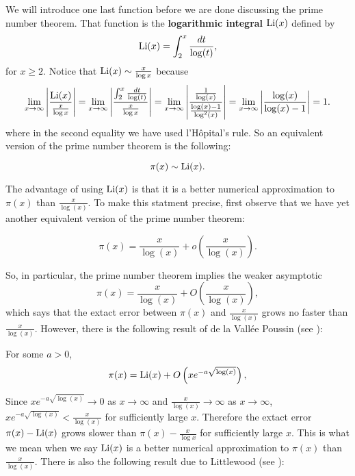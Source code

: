       We will introduce one last function before we are done discussing the prime number theorem. That function is the \textbf{logarithmic integral} $\operatorname{\mathrm{Li}}(x)$ defined by
      \[
        \operatorname{\mathrm{Li}}(x) = \int_{2}^{x}\frac{dt}{\log(t)},
      \]
      for $x \ge 2$. Notice that $\operatorname{\mathrm{Li}}(x) \sim \frac{x}{\log{x}}$ because
      \[
        \lim_{x \to \infty}\left|\frac{\operatorname{\mathrm{Li}}(x)}{\frac{x}{\log{x}}}\right| = \lim_{x \to \infty}\left|\frac{\int_{2}^{x}\frac{dt}{\log(t)}}{\frac{x}{\log{x}}}\right| = \lim_{x \to \infty}\left|\frac{\frac{1}{\log(x)}}{\frac{\log(x)-1}{\log^{2}(x)}}\right| = \lim_{x \to \infty}\left|\frac{\log(x)}{\log(x)-1}\right| = 1.
      \]
      where in the second equality we have used  l'H\^opital's rule. So an equivalent version of the prime number theorem is the following:

      \begin{theorem}
        \phantom{ }
        \[
          \pi(x) \sim \operatorname{\mathrm{Li}}(x).
        \]
      \end{theorem}

      The advantage of using $\operatorname{\mathrm{Li}}(x)$ is that it is a better numerical approximation to $\pi(x)$ than $\frac{x}{\log(x)}$. To make this statment precise, first observe that we have yet another equivalent version of the prime number theorem:

      \begin{theorem}
        \phantom{ }
        \[
          \pi(x) = \frac{x}{\log(x)}+o\left(\frac{x}{\log(x)}\right).
        \]
      \end{theorem}

      So, in particular, the prime number theorem implies the weaker asymptotic
      \[
        \pi(x) = \frac{x}{\log(x)}+O\left(\frac{x}{\log(x)}\right),
      \]
      which says that the extact error between $\pi(x)$ and $\frac{x}{\log(x)}$ grows no faster than $\frac{x}{\log(x)}$. However, there is the following result of de la Vall\'ee Poussin (see \cite{poussin1899fonction}):

      \begin{proposition}
        For some $a > 0$,
        \[
          \pi(x) = \operatorname{\mathrm{Li}}(x)+O\left(xe^{-a\sqrt{\log(x)}}\right),
        \]
      \end{proposition}
      
      Since $xe^{-a\sqrt{\log(x)}} \to 0$ as $x \to \infty$ and $\frac{x}{\log(x)} \to \infty$ as $x \to \infty$, $xe^{-a\sqrt{\log(x)}} < \frac{x}{\log(x)}$ for sufficiently large $x$. Therefore the extact error $\pi(x)-\operatorname{\mathrm{Li}}(x)$ grows slower than $\pi(x)-\frac{x}{\log{x}}$ for sufficiently large $x$. This is what we mean when we say $\operatorname{\mathrm{Li}}(x)$ is a better numerical approximation to $\pi(x)$ than $\frac{x}{\log(x)}$. There is also the following result due to Littlewood (see \cite{littlewood1914distribution}):

